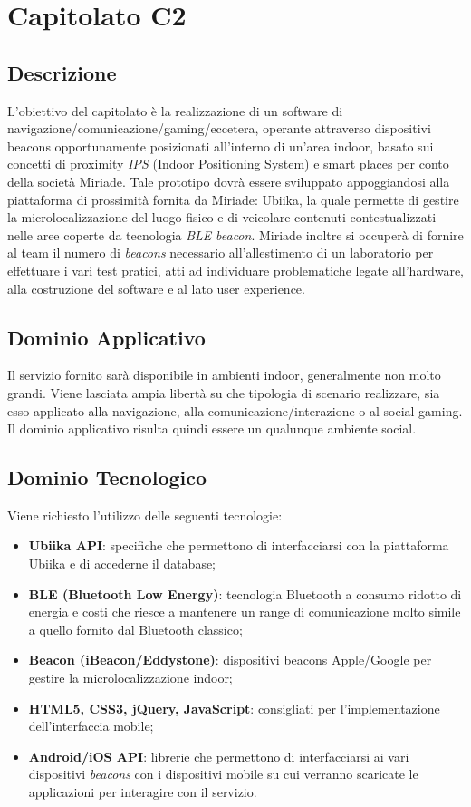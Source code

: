 \newpage
\section{Capitolato C2}
\subsection{Descrizione}
L'obiettivo del capitolato è la realizzazione di un software di navigazione/comunicazione/gaming/eccetera, operante attraverso dispositivi beacons opportunamente posizionati all'interno di un'area indoor, basato sui concetti di proximity \textit{IPS} (Indoor Positioning System) e smart places per conto della società Miriade. Tale prototipo dovrà essere sviluppato appoggiandosi alla piattaforma di prossimità fornita da Miriade: Ubiika, la quale permette di gestire la microlocalizzazione del luogo fisico e di veicolare contenuti contestualizzati nelle aree coperte da tecnologia \textit{BLE} \textit{beacon}. Miriade inoltre si occuperà di fornire al team il numero di \textit{beacons} necessario all'allestimento di un laboratorio per effettuare i vari test pratici, atti ad individuare problematiche legate all'hardware, alla costruzione del software e al lato user experience.     

\subsection{Dominio Applicativo}
Il servizio fornito sarà disponibile in ambienti indoor, generalmente non molto grandi. Viene lasciata ampia libertà su che tipologia di scenario realizzare, sia esso applicato alla navigazione, alla comunicazione/interazione o al social gaming. Il dominio applicativo risulta quindi essere un qualunque ambiente social. 

\subsection{Dominio Tecnologico}
Viene richiesto l'utilizzo delle seguenti tecnologie:
\begin{itemize}
\item \textbf{Ubiika API}: specifiche che permettono di interfacciarsi con la piattaforma Ubiika e di accederne il database;
\item \textbf{BLE (Bluetooth Low Energy)}: tecnologia Bluetooth a consumo ridotto di energia e costi che riesce a mantenere un range di comunicazione molto simile a quello fornito dal Bluetooth classico;
\item \textbf{Beacon (iBeacon/Eddystone)}: dispositivi beacons Apple/Google per gestire la microlocalizzazione indoor;
\item \textbf{HTML5, CSS3, jQuery, JavaScript}: consigliati per l'implementazione dell'interfaccia mobile;
\item \textbf{Android/iOS API}: librerie che permettono di interfacciarsi ai vari dispositivi \textit{beacons} con i dispositivi mobile su cui verranno scaricate le applicazioni per interagire con il servizio.
\end{itemize}


